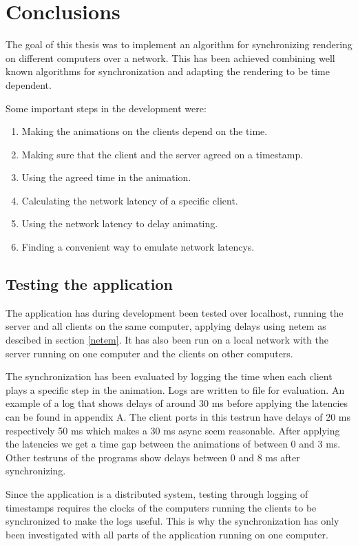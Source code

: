 \chapter{Conclusions}
The goal of this thesis was to implement an algorithm for synchronizing rendering on different computers over a network. This has been achieved combining well known algorithms for synchronization and adapting the rendering to be time dependent. 

Some important steps in the development were:
\begin{enumerate}
  \item Making the animations on the clients depend on the time. 
  \item Making sure that the client and the server agreed on a timestamp.
  \item Using the agreed time in the animation.
  \item Calculating the network latency of a specific client.
  \item Using the network latency to delay animating. 
  \item Finding a convenient way to emulate network latencys.
\end{enumerate}

\section {Testing the application}
The application has during development been tested over localhost, running the server and all clients on the same computer, applying delays using netem as descibed in section \ref{netem}. It has also been run on a local network with the server running on one computer and the clients on other computers. 

The synchronization has been evaluated by logging the time when each client plays a specific step in the animation. Logs are written to file for evaluation. An example of a log that shows delays of around 30 ms before applying the latencies can be found in appendix A. The client ports in this testrun have delays of 20 ms respectively 50 ms which makes a 30 ms async seem reasonable. After applying the latencies we get a time gap between the animations of between 0 and 3 ms. Other testruns of the programs show delays between 0 and 8 ms after synchronizing. 

Since the application is a distributed system, testing through logging of timestamps requires the clocks of the computers running the clients to be synchronized to make the logs useful. This is why the synchronization has only been investigated with all parts of the application running on one computer. 

